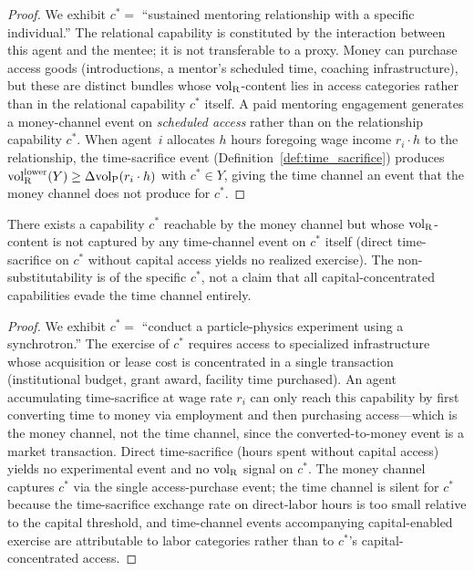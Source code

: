 \begin{proof}
We exhibit $c^\ast = $ ``sustained mentoring relationship with a
specific individual.''  The relational capability is constituted
by the interaction between this agent and the mentee; it is not
transferable to a proxy.  Money can purchase access goods
(introductions, a mentor's scheduled time, coaching
infrastructure), but these are distinct bundles whose
${\operatorname{vol}_{\mathrm{R}}}$-content lies in access categories rather than in the
relational capability $c^\ast$ itself.  A paid mentoring
engagement generates a money-channel event on \emph{scheduled
access} rather than on the relationship capability $c^\ast$.
When agent~$i$ allocates $h$ hours foregoing wage income
$r_i \cdot h$ to the relationship, the time-sacrifice event
(Definition~\ref{def:time_sacrifice}) produces
${\operatorname{vol}_{\mathrm{R}}^{\mathrm{lower}}}(Y) \geq \Delta{\operatorname{vol}_{\mathrm{P}}}(r_i \cdot h)$ with $c^\ast \in
Y$, giving the time channel an event that the money channel
does not produce for $c^\ast$.
\end{proof}

\begin{proposition}
\label{prop:capital_concentrated}
There exists a capability $c^\ast$ reachable by the money
channel but whose ${\operatorname{vol}_{\mathrm{R}}}$-content is not captured by any
time-channel event on $c^\ast$ itself (direct time-sacrifice on
$c^\ast$ without capital access yields no realized exercise).
The non-substitutability is of the specific $c^\ast$, not a
claim that all capital-concentrated capabilities evade the time
channel entirely.
\end{proposition}

\begin{proof}
We exhibit $c^\ast = $ ``conduct a particle-physics experiment
using a synchrotron.''  The exercise of $c^\ast$ requires access
to specialized infrastructure whose acquisition or lease cost is
concentrated in a single transaction (institutional budget,
grant award, facility time purchased).  An agent accumulating
time-sacrifice at wage rate $r_i$ can only reach this capability
by first converting time to money via employment and then
purchasing access---which is the money channel, not the time
channel, since the converted-to-money event is a market
transaction.  Direct time-sacrifice (hours spent without capital
access) yields no experimental event and no ${\operatorname{vol}_{\mathrm{R}}}$ signal on
$c^\ast$.  The money channel captures $c^\ast$ via the single
access-purchase event; the time channel is silent for $c^\ast$
because the time-sacrifice exchange rate on direct-labor hours
is too small relative to the capital threshold, and
time-channel events accompanying capital-enabled exercise are
attributable to labor categories rather than to $c^\ast$'s
capital-concentrated access.
\end{proof}

